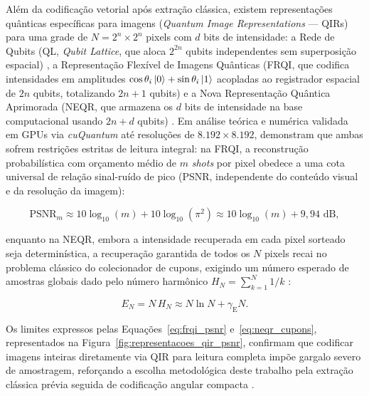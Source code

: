 \documentclass[
    12pt,
    openright,
    oneside,
    a4paper,
    english,
    brazil
]{abntex2}
\begin{document}
Além da codificação vetorial após extração clássica, existem representações quânticas específicas para imagens (\textit{Quantum Image Representations} --- QIRs) para uma grade de \(N = 2^n \times 2^n\) pixels com \(d\) bits de intensidade: a Rede de Qubits (QL, \textit{Qubit Lattice}, que aloca \(2^{2n}\) qubits independentes sem superposição espacial) \cite{venegasandraca2003qubitlattice}, a Representação Flexível de Imagens Quânticas (FRQI, que codifica intensidades em amplitudes \(\cos\theta_i\ket{0}+\sin\theta_i\ket{1}\) acopladas ao registrador espacial de \(2n\) qubits, totalizando \(2n+1\) qubits) \cite{le2011frqi} e a Nova Representação Quântica Aprimorada (NEQR, que armazena os \(d\) bits de intensidade na base computacional usando \(2n+d\) qubits) \cite{zhang2013neqr}. Em análise teórica e numérica validada em GPUs via \textit{cuQuantum} até resoluções de \(8.192 \times 8.192\),  demonstram que ambas sofrem restrições estritas de leitura integral: na FRQI, a reconstrução probabilística com orçamento médio de \(m\) \textit{shots} por pixel obedece a uma cota universal de relação sinal-ruído de pico (PSNR, independente do conteúdo visual e da resolução da imagem):

\begin{equation}
\label{eq:frqi_psnr}
\mathrm{PSNR}_m \approx 10\log_{10}(m) + 10\log_{10}(\pi^2) \approx 10\log_{10}(m) + 9{,}94\text{ dB},
\end{equation}

enquanto na NEQR, embora a intensidade recuperada em cada pixel sorteado seja determinística, a recuperação garantida de todos os \(N\) pixels recai no problema clássico do colecionador de cupons, exigindo um número esperado de amostras globais dado pelo número harmônico \(H_N = \sum_{k=1}^N 1/k\) \cite{okada2025measurementlimits}:

\begin{equation}
\label{eq:neqr_cupons}
E_N = N\, H_N \approx N\ln N + \gamma_{\text{E}} N.
\end{equation}

Os limites expressos pelas Equações~\eqref{eq:frqi_psnr} e~\eqref{eq:neqr_cupons}, representados na Figura~\ref{fig:representacoes_qir_psnr}, confirmam que codificar imagens inteiras diretamente via QIR para leitura completa impõe gargalo severo de amostragem, reforçando a escolha metodológica deste trabalho pela extração clássica prévia seguida de codificação angular compacta \cite{okada2025measurementlimits}.
\end{document}
